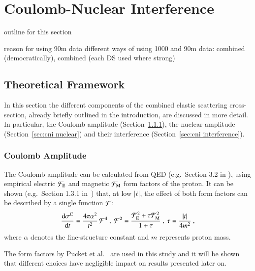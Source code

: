 \newpage

\section{Coulomb-Nuclear Interference}
\label{sec:coulomb}

\> outline for this section

\> reason for using 90m data
\> different ways of using 1000 and 90m data: combined (democratically), combined (each DS used where strong)


\subsection{Theoretical Framework}
\label{sec:cni framework}

In this section the different components of the combined elastic scattering cross-section, already briefly outlined in the introduction, are discussed in more detail. In particular, the Coulomb amplitude (Section~\ref{sec:cni coulomb}), the nuclear amplitude (Section~\ref{sec:cni nuclear}) and their interference (Section~\ref{sec:cni interference}).

\subsubsection{Coulomb Amplitude}
\label{sec:cni coulomb}
%
The Coulomb amplitude can be calculated from QED (e.g.~Section 3.2 in \cite{block06}), using empirical electric ${\cal F}_{\rm E}$ and magnetic ${\cal F}_{\rm M}$ form factors of the proton. It can be shown (e.g.~Section 1.3.1 in~\cite{jan_thesis}) that, at low $|t|$, the effect of both form factors can be described by a single function ${\cal F}$:
\begin{equation}
\label{eq:coul cs}
	{\d\sigma^{\rm C}\over \d t} = {4\pi\alpha^2\over t^2}\,{\cal F}^4\ ,\ 
	{\cal F}^2 = {{\cal F}_{\rm E}^2 + \tau {\cal F}_{\rm M}^2\over 1 + \tau}\ ,\ 
	\tau = {|t|\over 4m^2}\ ,
\end{equation}
where $\alpha$ denotes the fine-structure constant and $m$ represents proton mass.

The form factors by Pucket et al.~\cite{puckett10} are used in this study and it will be shown that different choices have negligible impact on results presented later on.


